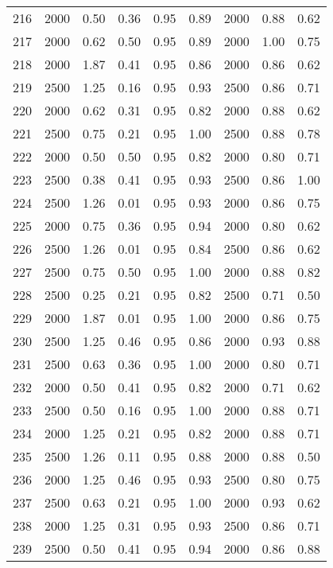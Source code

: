 \begin{longtable}[c]{ccccccccc}
216 &  2000 &  0.50 &  0.36 &  0.95 &  0.89 &  2000 &  0.88 &  0.62 \\
217 &  2000 &  0.62 &  0.50 &  0.95 &  0.89 &  2000 &  1.00 &  0.75 \\
218 &  2000 &  1.87 &  0.41 &  0.95 &  0.86 &  2000 &  0.86 &  0.62 \\
219 &  2500 &  1.25 &  0.16 &  0.95 &  0.93 &  2500 &  0.86 &  0.71 \\
220 &  2000 &  0.62 &  0.31 &  0.95 &  0.82 &  2000 &  0.88 &  0.62 \\
221 &  2500 &  0.75 &  0.21 &  0.95 &  1.00 &  2500 &  0.88 &  0.78 \\
222 &  2000 &  0.50 &  0.50 &  0.95 &  0.82 &  2000 &  0.80 &  0.71 \\
223 &  2500 &  0.38 &  0.41 &  0.95 &  0.93 &  2500 &  0.86 &  1.00 \\
224 &  2500 &  1.26 &  0.01 &  0.95 &  0.93 &  2000 &  0.86 &  0.75 \\
225 &  2000 &  0.75 &  0.36 &  0.95 &  0.94 &  2000 &  0.80 &  0.62 \\
226 &  2500 &  1.26 &  0.01 &  0.95 &  0.84 &  2500 &  0.86 &  0.62 \\
227 &  2500 &  0.75 &  0.50 &  0.95 &  1.00 &  2000 &  0.88 &  0.82 \\
228 &  2500 &  0.25 &  0.21 &  0.95 &  0.82 &  2500 &  0.71 &  0.50 \\
229 &  2000 &  1.87 &  0.01 &  0.95 &  1.00 &  2000 &  0.86 &  0.75 \\
230 &  2500 &  1.25 &  0.46 &  0.95 &  0.86 &  2000 &  0.93 &  0.88 \\
231 &  2500 &  0.63 &  0.36 &  0.95 &  1.00 &  2000 &  0.80 &  0.71 \\
232 &  2000 &  0.50 &  0.41 &  0.95 &  0.82 &  2000 &  0.71 &  0.62 \\
233 &  2500 &  0.50 &  0.16 &  0.95 &  1.00 &  2000 &  0.88 &  0.71 \\
234 &  2000 &  1.25 &  0.21 &  0.95 &  0.82 &  2000 &  0.88 &  0.71 \\
235 &  2500 &  1.26 &  0.11 &  0.95 &  0.88 &  2000 &  0.88 &  0.50 \\
236 &  2000 &  1.25 &  0.46 &  0.95 &  0.93 &  2500 &  0.80 &  0.75 \\
237 &  2500 &  0.63 &  0.21 &  0.95 &  1.00 &  2000 &  0.93 &  0.62 \\
238 &  2000 &  1.25 &  0.31 &  0.95 &  0.93 &  2500 &  0.86 &  0.71 \\
239 &  2500 &  0.50 &  0.41 &  0.95 &  0.94 &  2000 &  0.86 &  0.88 \\

\end{longtable}

